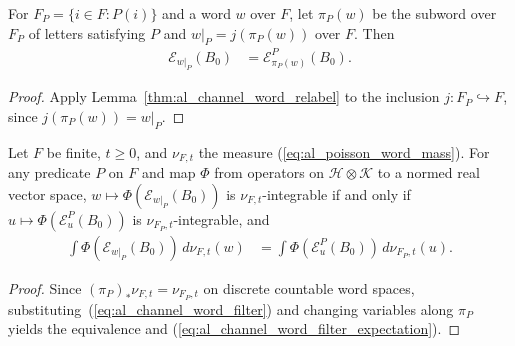\begin{lemma}
    \label{thm:al_channel_word_filter}
    \leanok
    For $F_P=\{i\in F:P(i)\}$ and a word $w$ over $F$, let $\pi_P(w)$ be the
    subword over $F_P$ of letters satisfying $P$ and $w|_P=j(\pi_P(w))$ over
    $F$. Then
    \begin{align}
        \label{eq:al_channel_word_filter}
        \mathcal E_{w|_P}(B_0)
         & =\mathcal E^P_{\pi_P(w)}(B_0).
    \end{align}
\end{lemma}
\begin{proof}
    \leanok
    Apply Lemma~\ref{thm:al_channel_word_relabel} to the inclusion
    $j:F_P\hookrightarrow F$, since $j(\pi_P(w))=w|_P$.
\end{proof}

\begin{lemma}
    \label{thm:al_channel_word_filter_expectation}
    \leanok
    Let $F$ be finite, $t\ge0$, and $\nu_{F,t}$ the measure
    (\ref{eq:al_poisson_word_mass}). For any predicate $P$ on $F$ and map
    $\Phi$ from operators on $\mathcal H\otimes\mathcal K$ to a normed real
    vector space, $w\mapsto\Phi(\mathcal E_{w|_P}(B_0))$ is
    $\nu_{F,t}$-integrable if and only if $u\mapsto\Phi(\mathcal E^P_u(B_0))$
    is $\nu_{F_P,t}$-integrable, and
    \begin{align}
        \label{eq:al_channel_word_filter_expectation}
        \int\Phi(\mathcal E_{w|_P}(B_0))\,d\nu_{F,t}(w)
         & =\int\Phi(\mathcal E^P_u(B_0))\,d\nu_{F_P,t}(u).
    \end{align}
\end{lemma}
\begin{proof}
    \leanok
    Since $(\pi_P)_*\nu_{F,t}=\nu_{F_P,t}$ on discrete countable word spaces,
    substituting~(\ref{eq:al_channel_word_filter}) and changing variables along
    $\pi_P$ yields the equivalence and
    (\ref{eq:al_channel_word_filter_expectation}).
\end{proof}

